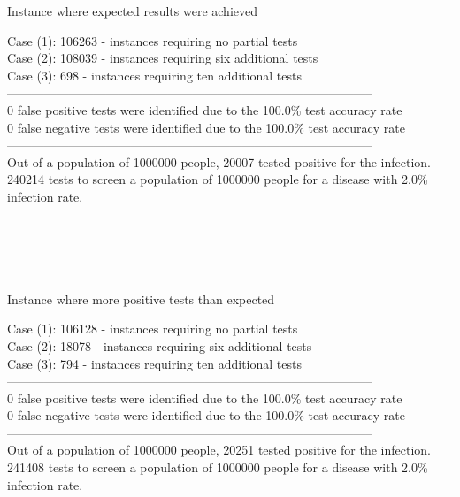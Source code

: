 \documentclass[letterpaper, 10pt,DIV=13]{scrartcl}
\numberwithin{equation}{section} %
\numberwithin{figure}{section} %
\numberwithin{table}{section} %
\begin{document}
\begin{displayquote}
\begin{center}
    Instance where expected results were achieved
\end{center}
Case (1): 106263 - instances requiring no partial tests\\
Case (2): 108039 - instances requiring six additional tests\\
Case (3): 698 - instances requiring ten additional tests\\
-----------------------------------------------------------------------------------------\\
0 false positive tests were identified due to the 100.0\% test accuracy rate\\
0 false negative tests were identified due to the 100.0\% test accuracy rate\\
-----------------------------------------------------------------------------------------\\
Out of a population of 1000000 people, 20007 tested positive for the infection.\\
240214 tests to screen a population of 1000000 people for a disease with 2.0\% infection rate.\\
\end{displayquote}
\\
\begin{center}
\rule{12cm}{.4pt}
\end{center}
\\
\begin{displayquote}
\begin{center}
    Instance where more positive tests than expected
\end{center}
Case (1): 106128 - instances requiring no partial tests\\
Case (2): 18078 - instances requiring six additional tests\\
Case (3): 794 - instances requiring ten additional tests\\
-----------------------------------------------------------------------------------------\\
0 false positive tests were identified due to the 100.0\% test accuracy rate\\
0 false negative tests were identified due to the 100.0\% test accuracy rate\\
-----------------------------------------------------------------------------------------\\
Out of a population of 1000000 people, 20251 tested positive for the infection.\\
241408 tests to screen a population of 1000000 people for a disease with 2.0\% infection rate.\\
\end{displayquote}
\end{document}
